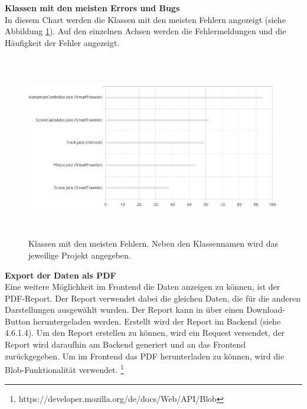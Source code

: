 \textbf{Klassen mit den meisten Errors und Bugs} \\
In diesem Chart werden die Klassen mit den meisten Fehlern angezeigt (siehe Abbildung \ref{fig:mostCommonClasses}). Auf den einzelnen Achsen werden die Fehlermeldungen und die Häufigkeit der Fehler angezeigt.

\begin{figure}[tp]
  \centering
  \includegraphics[height=8cm]{images/mostCommonClasses.PNG}
 \caption[Klassen mit den meisten Fehlern. Neben den Klassennamen wird das jeweilige Projekt angegeben.]{Klassen mit den meisten Fehlern. Neben den Klassennamen wird das jeweilige Projekt angegeben.}
  \label{fig:mostCommonClasses}
\end{figure}

\textbf{Export der Daten als PDF} \\
Eine weitere Möglichkeit im Frontend die Daten anzeigen zu können, ist der PDF-Report. Der Report verwendet dabei die gleichen Daten, die für die anderen Darstellungen ausgewählt wurden. Der Report kann in über einen Download-Button heruntergeladen werden. Erstellt wird der Report im Backend (siehe 4.6.1.4). Um den Report erstellen zu können, wird ein Request versendet, der Report wird daraufhin am Backend generiert und an das Frontend zurückgegeben. Um im Frontend das PDF herunterladen zu können, wird die Blob-Funktionalität verwendet. \footnote{https://developer.mozilla.org/de/docs/Web/API/Blob}

\lstset{
  caption={Herunterladen eines PDF-Files in Javascript mit Blob.}, 
  basicstyle=\small\ttfamily, 
  label=lst:blobDownload, 
  language=Java,
  frame=single,
  breaklines=true, %
  postbreak=\mbox{\textcolor{red}{$\hookrightarrow$}\space},
}

